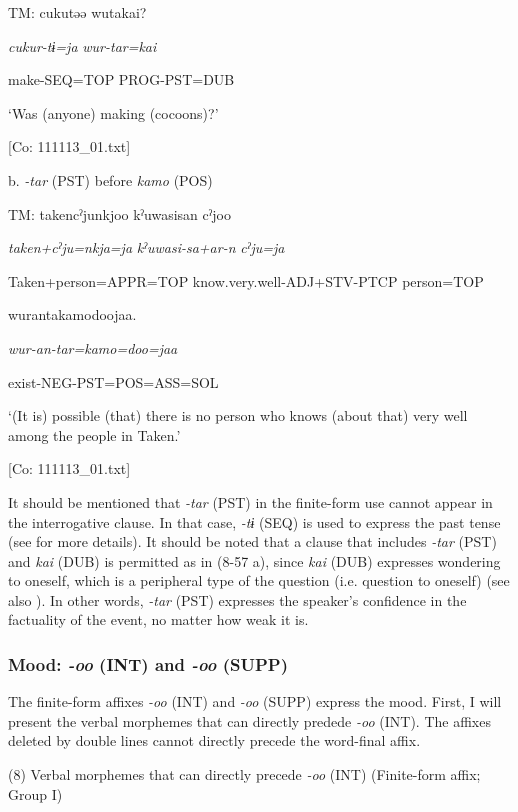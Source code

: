   TM:  cukutəə  wutakai?

    \textit{cukur-tɨ=ja}  \textit{wur-tar=kai}

    make-SEQ=TOP  PROG-PST=DUB

    ‘Was (anyone) making (cocoons)?’

    [Co: 111113\_01.txt]

  b. \textit{{}-tar} (PST) before \textit{kamo} (POS)

  TM:  takencˀjunkjoo  kˀuwasisan  cˀjoo

    \textit{taken+cˀju=nkja=ja}  \textit{kˀuwasi-sa+ar-n}  \textit{cˀju=ja}

    Taken+person=APPR=TOP  know.very.well-ADJ+STV-PTCP  person=TOP

    wurantakamodoojaa.

    \textit{wur-an-tar=kamo=doo=jaa}

    exist-NEG-PST=POS=ASS=SOL

    ‘(It is) possible (that) there is no person who knows (about that) very well among the people in Taken.’

    [Co: 111113\_01.txt]

  It should be mentioned that \textit{{}-tar} (PST) in the finite-form use cannot appear in the interrogative clause. In that case, \textit{{}-tɨ} (SEQ) is used to express the past tense (see  for more details). It should be noted that a clause that includes \textit{{}-tar} (PST) and \textit{kai} (DUB) is permitted as in (8-57 a), since \textit{kai} (DUB) expresses wondering to oneself, which is a peripheral type of the question (i.e. question to oneself) (see also ). In other words, \textit{{}-tar} (PST) expresses the speaker’s confidence in the factuality of the event, no matter how weak it is.

\subsubsection{Mood: \textit{{}-oo} (INT) and \textit{{}-oo} (SUPP)}

The finite-form affixes \textit{-oo} (INT) and \textit{{}-oo} (SUPP) express the mood. First, I will present the verbal morphemes that can directly predede \textit{{}-oo} (INT). The affixes deleted by double lines cannot directly precede the word-final affix.

(8)  Verbal morphemes that can directly precede \textit{-oo} (INT) (Finite-form affix; Group I)

